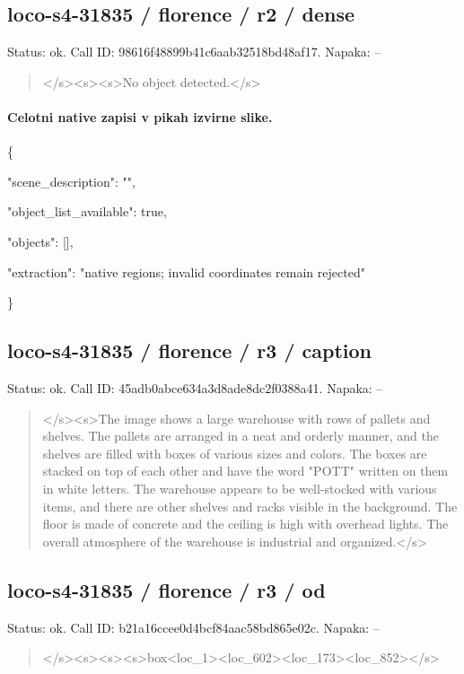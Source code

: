 \documentclass[10pt,a4paper]{article}
\begin{document}
\subsection*{loco-s4-31835 / florence / r2 / dense}
Status: ok. Call ID: 98616f48899b41c6aab32518bd48af17. Napaka: --
\begin{quote}\footnotesize
</s>\allowbreak{}<s>\allowbreak{}<s>\allowbreak{}No object detected.</s>\allowbreak{}
\end{quote}
\paragraph{Celotni native zapisi v pikah izvirne slike.}
\{\par
  "scene\_description":\allowbreak{} "",\allowbreak{}\par
  "object\_list\_available":\allowbreak{} true,\allowbreak{}\par
  "objects":\allowbreak{} [],\allowbreak{}\par
  "extraction":\allowbreak{} "native regions; invalid coordinates remain rejected"\par
\}
\subsection*{loco-s4-31835 / florence / r3 / caption}
Status: ok. Call ID: 45adb0abce634a3d8ade8dc2f0388a41. Napaka: --
\begin{quote}\footnotesize
</s>\allowbreak{}<s>\allowbreak{}The image shows a large warehouse with rows of pallets and shelves. The pallets are arranged in a neat and orderly manner,\allowbreak{} and the shelves are filled with boxes of various sizes and colors. The boxes are stacked on top of each other and have the word "POTT" written on them in white letters. The warehouse appears to be well-stocked with various items,\allowbreak{} and there are other shelves and racks visible in the background. The floor is made of concrete and the ceiling is high with overhead lights. The overall atmosphere of the warehouse is industrial and organized.</s>\allowbreak{}
\end{quote}
\subsection*{loco-s4-31835 / florence / r3 / od}
Status: ok. Call ID: b21a16ccee0d4bcf84aac58bd865e02c. Napaka: --
\begin{quote}\footnotesize
</s>\allowbreak{}<s>\allowbreak{}<s>\allowbreak{}<s>\allowbreak{}box<loc\_1>\allowbreak{}<loc\_602>\allowbreak{}\allowbreak{}<loc\_173>\allowbreak{}<loc\_852>\allowbreak{}</s>\allowbreak{}
\end{quote}
\end{document}
